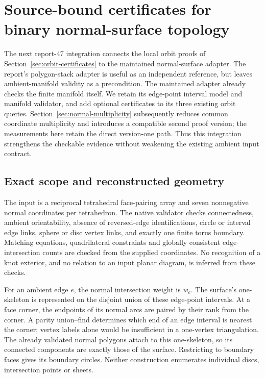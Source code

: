 \section{Source-bound certificates for binary normal-surface topology}
\label{sec:normal-certificates}

The next report-47 integration connects the local orbit proofs of
Section~\ref{sec:orbit-certificates} to the maintained normal-surface adapter.
The report's polygon-stack adapter is useful as an independent reference,
but leaves ambient-manifold validity as a precondition. The maintained
adapter already checks the finite manifold itself. We retain its edge-point
interval model and manifold validator, and add optional certificates to its
three existing orbit queries. Section~\ref{sec:normal-multiplicity} subsequently
reduces common coordinate multiplicity and introduces a compatible second
proof version; the measurements here retain the direct version-one path.
Thus this integration strengthens the
checkable evidence without weakening the existing ambient input contract.

\subsection{Exact scope and reconstructed geometry}

The input is a reciprocal tetrahedral face-pairing array and seven
nonnegative normal coordinates per tetrahedron. The native validator checks
connectedness, ambient orientability, absence of reversed-edge
identifications, circle or interval edge links, sphere or disc vertex links,
and exactly one finite torus boundary. Matching equations, quadrilateral
constraints and globally consistent edge-intersection counts are checked
from the supplied coordinates. No recognition of a knot exterior, and no
relation to an input planar diagram, is inferred from these checks.

For an ambient edge $e$, the normal intersection weight is $w_e$.
The surface's one-skeleton is represented on the disjoint union of these
edge-point intervals. At a face corner, the endpoints of its normal arcs
are paired by their rank from the corner. A parity union--find determines
which end of an edge interval is nearest the corner; vertex labels alone
would be insufficient in a one-vertex triangulation. The already validated
normal polygons attach to this one-skeleton, so its connected components
are exactly those of the surface. Restricting to boundary faces gives its
boundary circles. Neither construction enumerates individual discs,
intersection points or sheets.

